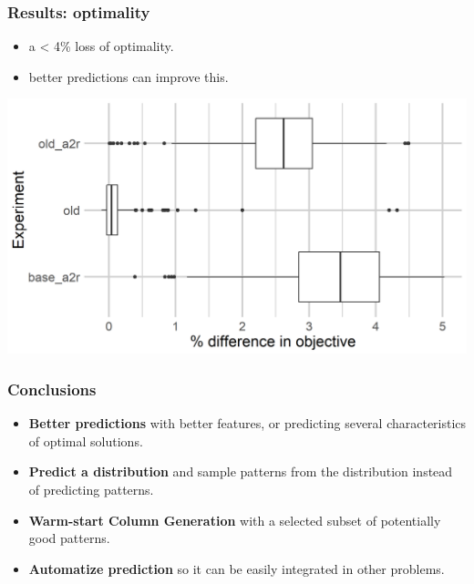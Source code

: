 \begin{frame}
\frametitle{\textbf{Results: optimality}}

  \begin{itemize}[<+->]
    \item a < 4\% loss of optimality.
    \item better predictions can improve this.
  \end{itemize}

  \includegraphics[width=0.8\linewidth]{images/quality_degradation_2tasks}

\end{frame}

\begin{frame}
\frametitle{\textbf{Conclusions}}
  \begin{itemize}[<+->]
  \item
    \textbf{Better predictions} with better features, or predicting
    several characteristics of optimal solutions.
  \item
    \textbf{Predict a distribution} and sample patterns from the
    distribution instead of predicting patterns.
  \item
    \textbf{Warm-start Column Generation} with a selected subset of
    potentially good patterns.
  \item
    \textbf{Automatize prediction} so it can be easily integrated in other
    problems.
  \end{itemize}
\end{frame}